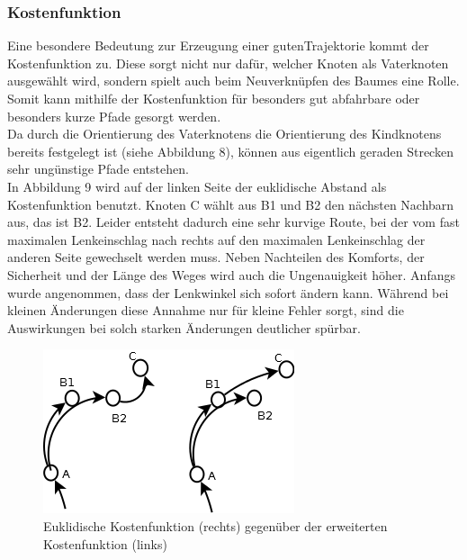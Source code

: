 \subsubsection{Kostenfunktion}
\label{sec:Kosten}
Eine besondere Bedeutung zur Erzeugung einer \glqq guten\grqq  Trajektorie kommt der Kostenfunktion zu. Diese sorgt nicht nur dafür, welcher Knoten als Vaterknoten ausgewählt wird, sondern spielt auch beim Neuverknüpfen des Baumes eine Rolle. Somit kann mithilfe der Kostenfunktion für besonders gut abfahrbare oder besonders kurze Pfade gesorgt werden. \\
Da durch die Orientierung des Vaterknotens die Orientierung des Kindknotens bereits festgelegt ist (siehe Abbildung 8), können aus eigentlich geraden Strecken sehr ungünstige Pfade entstehen.\\
 In Abbildung 9 wird auf der linken Seite der euklidische Abstand als Kostenfunktion benutzt. Knoten C wählt aus B1 und B2 den nächsten Nachbarn aus, das ist B2. Leider entsteht dadurch eine sehr kurvige Route, bei der vom fast maximalen Lenkeinschlag nach rechts auf den maximalen Lenkeinschlag der anderen Seite gewechselt werden muss. Neben Nachteilen des Komforts, der Sicherheit und der Länge des Weges wird auch die Ungenauigkeit höher. Anfangs wurde angenommen, dass der Lenkwinkel sich sofort ändern kann. Während bei kleinen Änderungen diese Annahme nur für kleine Fehler sorgt, sind die Auswirkungen bei solch starken Änderungen deutlicher spürbar.

\begin{figure}[htb]
  \label{fig:fig6}  
    \centering
\includegraphics[scale=1]{Bilder/Gute_schlechte_funktion.png} 
\caption{Euklidische Kostenfunktion (rechts) gegenüber der erweiterten Kostenfunktion (links)}
\end{figure}


